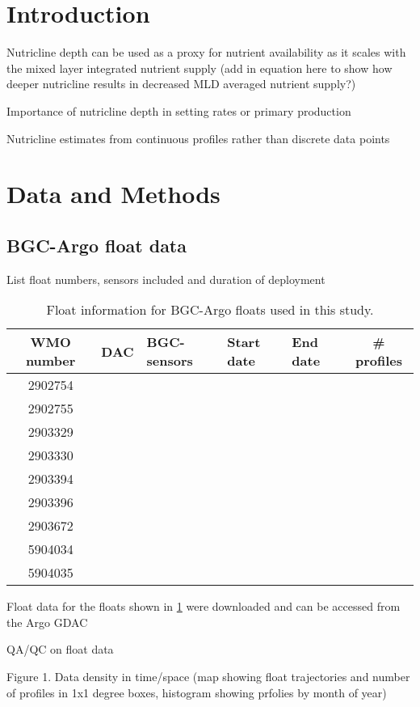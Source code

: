 \documentclass[utf8]{frontiersSCNS} %
\begin{document}
\section{Introduction}
Nutricline depth can be used as a proxy for nutrient availability as it scales with the mixed layer integrated nutrient supply (add in equation here to show how deeper nutricline results in decreased MLD averaged nutrient supply?)

Importance of nutricline depth in setting rates or primary production \citep{richardson2019vertical}

Nutricline estimates from continuous profiles rather than discrete data points

\citep{clayton2021synoptic}

\section{Data and Methods}
\subsection{BGC-Argo float data}
List float numbers, sensors included and duration of deployment

\begin{table}[]
\caption{Float information for BGC-Argo floats used in this study.}
\begin{tabular}{|c|c|l|l|l|c|}
\hline
WMO number & DAC & BGC-sensors &Start date  &End date & \# profiles\\
\hline
2902754 &  &  &  &  & \\
2902755 &  &  &  &  & \\
2903329 &  &  &  &  & \\
2903330 & & & & & \\
2903394 & & & & & \\
2903396 & & & & & \\
2903672 & & & & & \\
5904034 & & & & & \\
5904035 & & & & & \\
\hline
\end{tabular}
\label{floats}
\end{table}
Float data for the floats shown in \ref{floats} were downloaded and can be accessed from  the Argo GDAC \citep{argo2022}


QA/QC on float data \citep{maurer2021delayed}

Figure 1. Data density in time/space (map showing float trajectories and number of profiles in 1x1 degree boxes, histogram showing prfolies by month of year)
\end{document}
